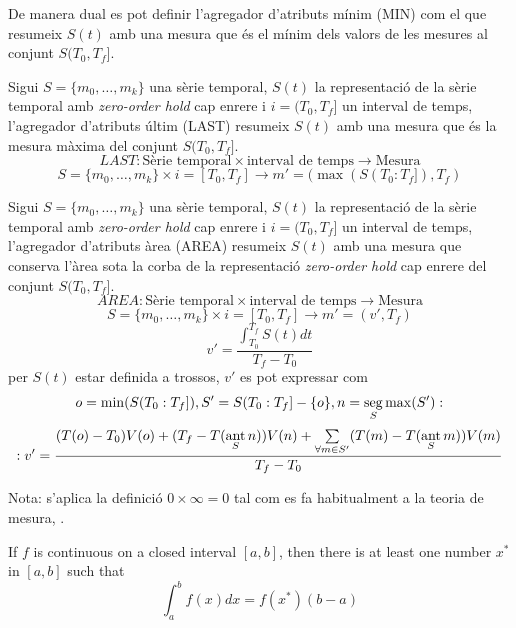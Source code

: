 De manera dual es pot definir l'agregador d'atributs mínim (MIN) com el
que resumeix $S(t)$ amb una mesura que és el mínim dels valors de les
mesures al conjunt $S(T_0,T_f]$.


\begin{definition}
  Sigui $S=\{m_0,\ldots,m_k\}$ una sèrie temporal, $S(t)$ la
  representació de la sèrie temporal amb \emph{zero-order hold} cap
  enrere i $i=(T_0,T_f]$ un interval de temps, l'agregador d'atributs últim
  (LAST) resumeix $S(t)$ amb una mesura que és la mesura màxima del
  conjunt $S(T_0,T_f]$.
\[
LAST: \text{Sèrie temporal} \times \text{interval de temps} \longrightarrow \text{Mesura}
\]
\[
S=\{m_0,\ldots,m_k\} \times i=[T_0,T_f]  \longrightarrow m'=(\max(S(T_0:T_f]),T_f)
\]
\end{definition}



\begin{definition}
  Sigui $S=\{m_0,\ldots,m_k\}$ una sèrie temporal, $S(t)$ la
  representació de la sèrie temporal amb \emph{zero-order hold} cap
  enrere i $i=(T_0,T_f]$ un interval de temps, l'agregador d'atributs àrea
  (AREA) resumeix $S(t)$ amb una mesura que conserva l'àrea sota la
  corba de la representació \emph{zero-order hold} cap enrere del
  conjunt $S(T_0,T_f]$.
\[
AREA: \text{Sèrie temporal} \times \text{interval de temps} \longrightarrow \text{Mesura}
\]
\[
S=\{m_0,\ldots,m_k\} \times i=[T_0,T_f]  \longrightarrow m'=(v',T_f)
\]
\[
v' = 
\frac{\int_{T_0}^{T_f} S(t) dt}{T_f - T_0}
\]
per $S(t)$ estar definida a trossos, $v'$ es pot expressar com
\[
o=\min(S(T_0:T_f]),
S'= S(T_0:T_f] - \{o\},
n=\seg\limits_S \max(S'): %
\]
\[
:v'= \frac{(T(o)-T_0)V(o) 
+( T_f- T(\operatorname*{ant}\limits_S n) )V(n) 
+\sum\limits_{\forall m \in S'}( T(m)- T(\operatorname*{ant}\limits_S m) )V(m)}
{T_f-T_0} 
\]

Nota: s'aplica la definició $0 \times \infty = 0$ tal com es fa habitualment a la teoria de mesura, \cite{wiki:extendedreal}.
\end{definition}



If $f$ is continuous on a closed interval $[a,b]$, then there is at least one number $x^*$ in $[a,b]$ such that
$$
\int_a^b f(x)dx = f(x^*)(b-a)
$$

